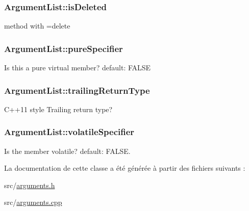 \subsubsection[{is\+Deleted}]{ Argument\+List\+::is\+Deleted}\label{class_argument_list_a0fd4d40dd62fb9f798d99cb63f966183}
method with =delete \hypertarget{class_argument_list_a3f023c090551e0ecaa588b25f895c047}{}
\subsubsection[{pure\+Specifier}]{ Argument\+List\+::pure\+Specifier}\label{class_argument_list_a3f023c090551e0ecaa588b25f895c047}
Is this a pure virtual member? default\+: F\+A\+L\+S\+E \hypertarget{class_argument_list_ac41ea581a7578480e4bed0d6c5e1af78}{}
\subsubsection[{trailing\+Return\+Type}]{ Argument\+List\+::trailing\+Return\+Type}\label{class_argument_list_ac41ea581a7578480e4bed0d6c5e1af78}
C++11 style Trailing return type? \hypertarget{class_argument_list_ae058c8cda0c6ce8837aab723e0af62bd}{}
\subsubsection[{volatile\+Specifier}]{ Argument\+List\+::volatile\+Specifier}\label{class_argument_list_ae058c8cda0c6ce8837aab723e0af62bd}
Is the member volatile? default\+: F\+A\+L\+S\+E. 

La documentation de cette classe a été générée à partir des fichiers suivants \+:\begin{DoxyCompactItemize}
\item 
src/\hyperlink{arguments_8h}{arguments.\+h}\item 
src/\hyperlink{arguments_8cpp}{arguments.\+cpp}\end{DoxyCompactItemize}
